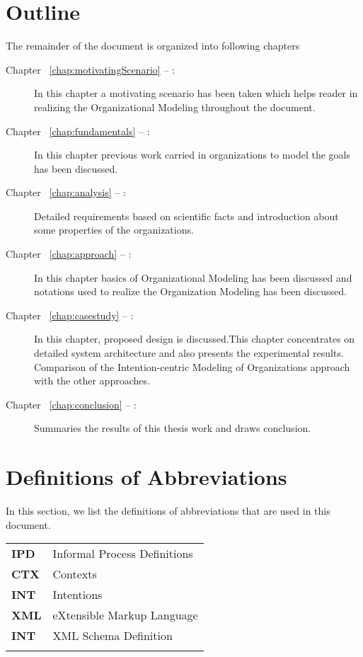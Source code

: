 \section {Outline}
\label{sec:outline}
The remainder of the document is organized into following chapters
\begin{description}
\item[Chapter ~\ref{chap:motivatingScenario} -- :] In this chapter a motivating scenario has been taken which helps reader in realizing the Organizational Modeling throughout the document. 
\item[Chapter ~\ref{chap:fundamentals} -- :] In this chapter previous work carried in organizations to model the goals has been discussed.
\item[Chapter ~\ref{chap:analysis} -- :] Detailed requirements based on scientific facts and introduction about some properties of the organizations.
\item[Chapter ~\ref{chap:approach} -- :] In this chapter basics of Organizational Modeling has been discussed and notations used to realize the Organization Modeling has been discussed.
\item[Chapter ~\ref{chap:casestudy} -- :] In this chapter, proposed design is discussed.This chapter concentrates on detailed system architecture and also presents the experimental results. Comparison of the Intention-centric Modeling of Organizations approach with the other approaches.
 
\item[Chapter ~\ref{chap:conclusion} -- :] Summaries the results of this thesis work and draws conclusion. 
\end{description}

\section{Definitions of Abbreviations}
\label{sec:definitionsandabbrevations}
In this section, we list the definitions of abbreviations that are used in this document.

\begin{center}
	\begin{longtable}{p{5cm}p{11cm}} 
		\textbf{IPD} & Informal Process Definitions\\
		\textbf{CTX} & Contexts\\
		\textbf{INT} & Intentions\\
		\textbf{XML} & eXtensible Markup Language\\
		\textbf{INT} & XML Schema Definition\\
		
       \label{tab:abbreviations}
    \end{longtable}	
\end{center}




